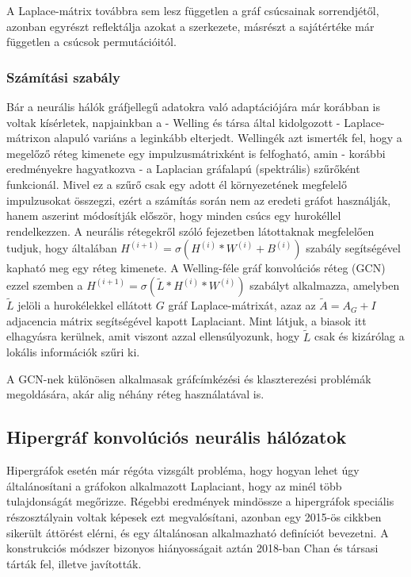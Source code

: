 A Laplace-mátrix továbbra sem lesz független a gráf csúcsainak sorrendjétől, azonban egyrészt reflektálja azokat a szerkezete, másrészt a sajátértéke már független a csúcsok permutációitól.

\subsubsection{Számítási szabály}
Bár a neurális hálók gráfjellegű adatokra való adaptációjára már korábban is voltak kísérletek\cite{old_gcnn, old_gcnn2}, napjainkban a - Welling és társa által kidolgozott - Laplace-mátrixon alapuló variáns\cite{base_gcnn} a leginkább elterjedt. Wellingék azt ismerték fel, hogy a megelőző réteg kimenete egy impulzusmátrixként is felfogható, amin - korábbi eredményekre hagyatkozva\cite{laplace_filter} - a Laplacian gráfalapú (spektrális) szűrőként funkcionál. Mivel ez a szűrő csak egy adott él környezetének megfelelő impulzusokat összegzi, ezért a számítás során nem az eredeti gráfot használják, hanem aszerint módosítják először, hogy minden csúcs egy hurokéllel rendelkezzen. A neurális rétegekről szóló fejezetben látottaknak megfelelően tudjuk, hogy általában $H^{(i+1)} = \sigma(H^{(i)} * W^{(i)} + B^{(i)})$ szabály segítségével kapható meg egy réteg kimenete. A Welling-féle gráf konvolúciós réteg (GCN) ezzel szemben a $H^{(i+1)} = \sigma(\tilde L * H^{(i)} * W^{(i)})$ szabályt alkalmazza, amelyben $\tilde L$ jelöli a hurokélekkel ellátott $G$ gráf Laplace-mátrixát, azaz az $\tilde A = A_G + I$ adjacencia mátrix segítségével kapott Laplaciant. Mint látjuk, a biasok itt elhagyásra kerülnek, amit viszont azzal ellensúlyozunk, hogy $\tilde L$ csak és kizárólag a lokális információk szűri ki.


A GCN-nek különösen alkalmasak gráfcímkézési és klaszterezési problémák megoldására, akár alig néhány réteg használatával is.

\subsection{Hipergráf konvolúciós neurális hálózatok}
Hipergráfok esetén már régóta vizsgált probléma, hogy hogyan lehet úgy általánosítani a gráfokon alkalmazott Laplaciant, hogy az minél több tulajdonságát megőrizze. Régebbi eredmények mindössze a hipergráfok speciális részosztályain voltak képesek ezt megvalósítani\cite{old_spectral_hypergraph, spectra}, azonban egy 2015-ös cikkben\cite{base_hypergraph_laplacian} sikerült áttörést elérni, és egy általánosan alkalmazható definíciót bevezetni. A konstrukciós módszer bizonyos hiányosságait aztán 2018-ban Chan és társasi tárták fel, illetve javították\cite{base_hypergraph_laplacian_refinement}.



